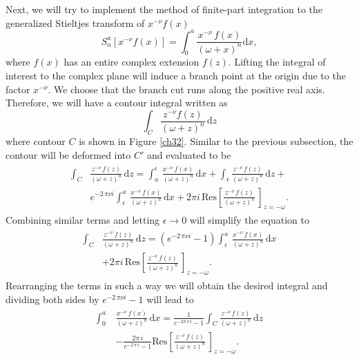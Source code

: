 Next, we will try to implement the method of finite-part integration to the generalized Stieltjes transform of $x^{-\nu} f(x)$  
\begin{equation}\label{bl}
		S_{n}^{a}[x^{-\nu}f(x)] = \int_{0}^{a}\frac{x^{-\nu}\,f(x)}{(\omega+x)^{n}}\mathrm{d}x,
\end{equation}
where $f(x)$ has an entire complex extension $f(z)$. Lifting the integral of interest to the complex plane will induce a branch point at the origin due to the factor $x^{-\nu}$. We choose that the branch cut runs along the positive real axis. Therefore, we will have a contour integral written as
\begin{equation}
    \int_C \frac{z^{-\nu} f(z)}{(\omega + z)^{n}} \, \mathrm{d}z
\end{equation}
where contour $C$ is shown in Figure \ref{ch32}. Similar to the previous subsection, the contour will be deformed into $C'$ and evaluated to be
\begin{align}
\begin{split}
    \int_{C} & \frac{z^{-\nu}\,f\left(z\right)}{\left(\omega+z\right)^{n}}\,\mathrm{d}z =  \int_{a}^{\epsilon}\,\frac{x^{-\nu}\,f\left(x\right)}{\left(\omega+z\right)^{n}}\,\mathrm{d}x + \int_\epsilon \frac{z^{-\nu}\,f\left(z\right)}{\left(\omega+z\right)^{n}}\,\mathrm{d}z + \\& e^{-2\,\pi \nu i} \int_{\epsilon}^a\,\frac{x^{-\nu}\,f\left(x\right)}{\left(\omega+z\right)^{n}}\,\mathrm{d}x + 2 \pi i \, \mathrm{Res}\left[\frac{z^{-\nu}\,f\left(z\right)}{\left(\omega+z\right)^{n}}\,\right]_{z=-\omega}.
\end{split}
\end{align}
Combining similar terms and letting $\epsilon \to 0$ will simplify the equation to
\begin{align}
\begin{split}
    \int_{C} & \frac{z^{-\nu}\,f\left(z\right)}{\left(\omega+z\right)^{n}}\,\mathrm{d}z = (e^{-2\,\pi \nu i} - 1) \int_{\epsilon}^{a}\,\frac{x^{-\nu}\,f\left(x\right)}{\left(\omega+z\right)^{n}}\,\mathrm{d}x \\& + 2 \pi i \, \mathrm{Res}\left[\frac{z^{-\nu}\,f\left(z\right)}{\left(\omega+z\right)^{n}}\,\right]_{z=-\omega} .
\end{split}
\end{align}
Rearranging the terms in such a way we will obtain the desired integral and dividing both sides by $e^{-2\,\pi \nu i} - 1$ will lead to
\begin{align}
\begin{split} \label{3.69}
	\int_{0}^{a}\,&\frac{x^{-\nu}\,f\left(x\right)}{\left(\omega+z\right)^{n}}\,\mathrm{d}x=\frac{1}{e^{-2\pi\,\nu\,i}-1}\int_{C}\frac{z^{-\nu}\,f\left(z\right)}{\left(\omega+z\right)^{n}}\,\mathrm{d}z\\&-\frac{2\pi\,i}{e^{-2\,\pi\,i}-1}\mathrm{Res}\left[\frac{z^{-\nu}\,f\left(z\right)}{\left(\omega+z\right)^{n}}\,\right]_{z=-\omega}.
\end{split}
\end{align}

